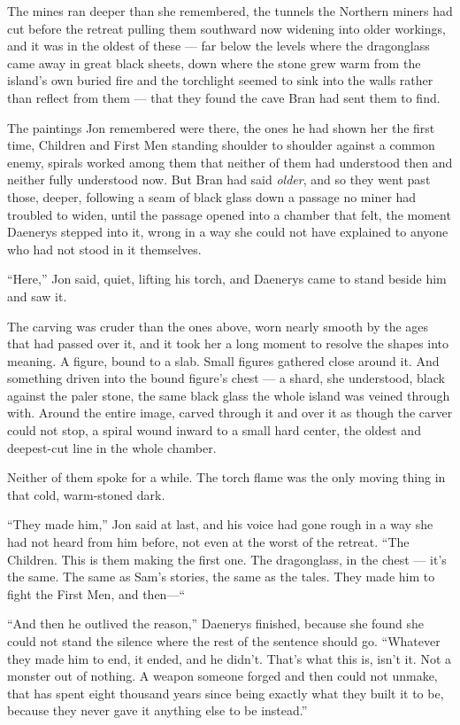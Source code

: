 \sceneBreak

The mines ran deeper than she remembered, the tunnels the Northern miners had cut before the retreat pulling them southward now widening into older workings, and it was in the oldest of these — far below the levels where the dragonglass came away in great black sheets, down where the stone grew warm from the island’s own buried fire and the torchlight seemed to sink into the walls rather than reflect from them — that they found the cave Bran had sent them to find.

The paintings Jon remembered were there, the ones he had shown her the first time, Children and First Men standing shoulder to shoulder against a common enemy, spirals worked among them that neither of them had understood then and neither fully understood now. But Bran had said \textit{older}, and so they went past those, deeper, following a seam of black glass down a passage no miner had troubled to widen, until the passage opened into a chamber that felt, the moment Daenerys stepped into it, wrong in a way she could not have explained to anyone who had not stood in it themselves.

“Here,” Jon said, quiet, lifting his torch, and Daenerys came to stand beside him and saw it.

The carving was cruder than the ones above, worn nearly smooth by the ages that had passed over it, and it took her a long moment to resolve the shapes into meaning. A figure, bound to a slab. Small figures gathered close around it. And something driven into the bound figure’s chest — a shard, she understood, black against the paler stone, the same black glass the whole island was veined through with. Around the entire image, carved through it and over it as though the carver could not stop, a spiral wound inward to a small hard center, the oldest and deepest-cut line in the whole chamber.

Neither of them spoke for a while. The torch flame was the only moving thing in that cold, warm-stoned dark.

“They made him,” Jon said at last, and his voice had gone rough in a way she had not heard from him before, not even at the worst of the retreat. “The Children. This is them making the first one. The dragonglass, in the chest — it’s the same. The same as Sam’s stories, the same as the tales. They made him to fight the First Men, and then—“

“And then he outlived the reason,” Daenerys finished, because she found she could not stand the silence where the rest of the sentence should go. “Whatever they made him to end, it ended, and he didn’t. That’s what this is, isn’t it. Not a monster out of nothing. A weapon someone forged and then could not unmake, that has spent eight thousand years since being exactly what they built it to be, because they never gave it anything else to be instead.”

